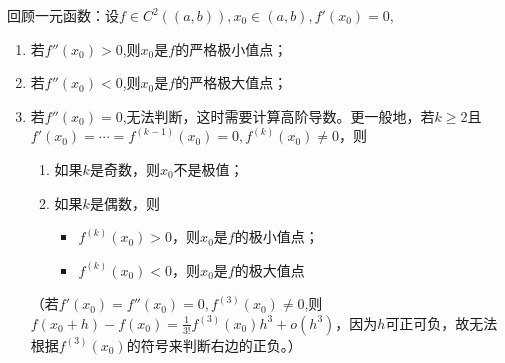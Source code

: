 \documentclass[UTF8]{ctexart}
\begin{document}
    回顾一元函数：设$f\in C^2((a,b)),x_0\in(a,b),f'(x_0)=0$,
    \begin{enumerate}
        \item 若$f''(x_0)>0$,则$x_0$是$f$的严格极小值点；
        \item 若$f''(x_0)<0$,则$x_0$是$f$的严格极大值点；
        \item 若$f''(x_0)=0$,无法判断，这时需要计算高阶导数。更一般地，若$k\ge 2$且$f'(x_0)=\cdots=f^{(k-1)}(x_0)=0,f^{(k)}(x_0)\not=0$，则
        \begin{enumerate}
            \item 如果$k$是奇数，则$x_0$不是极值；
            \item 如果$k$是偶数，则
            \begin{itemize}
                \item $f^{(k)}(x_0)>0$，则$x_0$是$f$的极小值点；
                \item $f^{(k)}(x_0)<0$，则$x_0$是$f$的极大值点
            \end{itemize}
        \end{enumerate}
        （若$f'(x_0)=f''(x_0)=0,f^{(3)}(x_0)\not=0$,则$f(x_0+h)-f(x_0)=\frac{1}{3!}f^{(3)}(x_0)h^3+o(h^3)$，因为$h$可正可负，故无法根据$f^{(3)}(x_0)$的符号来判断右边的正负。）
    \end{enumerate}
\end{document}
